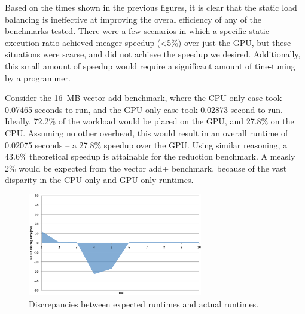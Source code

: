 \documentclass[journal]{IEEEtran}
\begin{document}




Based on the times shown in the previous figures, it is clear that the
static load balancing is ineffective at improving the overal efficiency
of any of the benchmarks tested.  There were a few scenarios in which
a specific static execution ratio achieved meager speedup (<5\%) over
just the GPU, but these situations were scarse, and did not achieve the
speedup we desired.  Additionally, this small amount of speedup would
require a significant amount of tine-tuning by a programmer.

Consider the 16~MB vector add benchmark, where the CPU-only case took
0.07465 seconds to run, and the GPU-only case took 0.02873 second to run.
Ideally, 72.2\% of the workload would be placed on the GPU, and 27.8\%
on the CPU.  Assuming no other overhead, this would result in an overall
runtime of 0.02075 seconds -- a 27.8\% speedup over the GPU.  Using similar
reasoning, a 43.6\% theoretical speedup is attainable for the reduction
benchmark.  A measly 2\% would be expected from the vector add+ benchmark,
because of the vast disparity in the CPU-only and GPU-only runtimes.

\begin{figure}[t]
\centering
\includegraphics[width=3.0in]{sequential_discrepancy}
\caption{Discrepancies between expected runtimes and actual runtimes.}
\label{fig:sequential_discrepancy}
\end{figure}
\end{document}
